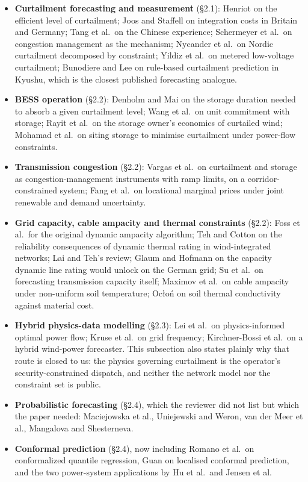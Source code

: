 \documentclass[11pt,a4paper]{article}
\begin{document}
\begin{itemize}[leftmargin=1.4em,itemsep=2pt]
\item \textbf{Curtailment forecasting and measurement} (\S2.1): Henriot on the efficient level of curtailment; Joos and Staffell on integration costs in Britain and Germany; Tang et al.\ on the Chinese experience; Schermeyer et al.\ on congestion management as the mechanism; Nycander et al.\ on Nordic curtailment decomposed by constraint; Yildiz et al.\ on metered low-voltage curtailment; Bunodiere and Lee on rule-based curtailment prediction in Kyushu, which is the closest published forecasting analogue.
\item \textbf{BESS operation} (\S2.2): Denholm and Mai on the storage duration needed to absorb a given curtailment level; Wang et al.\ on unit commitment with storage; Rayit et al.\ on the storage owner's economics of curtailed wind; Mohamad et al.\ on siting storage to minimise curtailment under power-flow constraints.
\item \textbf{Transmission congestion} (\S2.2): Vargas et al.\ on curtailment and storage as congestion-management instruments with ramp limits, on a corridor-constrained system; Fang et al.\ on locational marginal prices under joint renewable and demand uncertainty.
\item \textbf{Grid capacity, cable ampacity and thermal constraints} (\S2.2): Foss et al.\ for the original dynamic ampacity algorithm; Teh and Cotton on the reliability consequences of dynamic thermal rating in wind-integrated networks; Lai and Teh's review; Glaum and Hofmann on the capacity dynamic line rating would unlock on the German grid; Su et al.\ on forecasting transmission capacity itself; Maximov et al.\ on cable ampacity under non-uniform soil temperature; Ocło\'n on soil thermal conductivity against material cost.
\item \textbf{Hybrid physics-data modelling} (\S2.3): Lei et al.\ on physics-informed optimal power flow; Kruse et al.\ on grid frequency; Kirchner-Bossi et al.\ on a hybrid wind-power forecaster. This subsection also states plainly why that route is closed to us: the physics governing curtailment is the operator's security-constrained dispatch, and neither the network model nor the constraint set is public.
\item \textbf{Probabilistic forecasting} (\S2.4), which the reviewer did not list but which the paper needed: Maciejowska et al., Uniejewski and Weron, van der Meer et al., Mangalova and Shesterneva.
\item \textbf{Conformal prediction} (\S2.4), now including Romano et al.\ on conformalized quantile regression, Guan on localised conformal prediction, and the two power-system applications by Hu et al.\ and Jensen et al.
\end{itemize}
\end{document}
